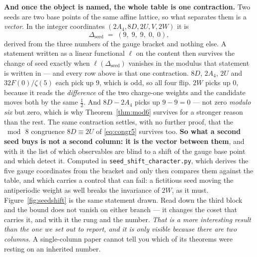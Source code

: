 \documentclass[11pt,a4paper]{article}
\begin{document}
\begin{itemize}
\noindent \textbf{And once the object is named, the whole table is one contraction.} Two seeds are
two base points of the same affine lattice, so what separates them is a \emph{vector}. In the
integer coordinates $(2A_4,8D,2U,V,2W)$ it is
\[
  \Delta_{\mathrm{seed}}\;=\;(9,\;9,\;9,\;0,\;0),
\]
derived from the three numbers of the gauge bracket and nothing else. A statement written as a
linear functional $\ell$ on the content then survives the change of seed exactly when
$\ell(\Delta_{\mathrm{seed}})$ vanishes in the modulus that statement is written in --- and every
row above is that one contraction. $8D$, $2A_4$, $2U$ and $32F(0)/\zeta(5)$ each pick up $9$, which
is odd, so all four flip. $2W$ picks up $0$, because it reads the \emph{difference} of the two
charge-one weights and the candidate moves both by the same $\tfrac12$. And $8D-2A_4$ picks up
$9-9=0$ --- not zero \emph{modulo six} but zero, which is why Theorem~\ref{thm:mod6} survives for a
stronger reason than the rest. The same contraction settles, with no further proof, that the
$\bmod\,8$ congruence $8D\equiv2U$ of \eqref{eq:congr5} survives too. \textbf{So what a second seed
buys is not a second column: it is the vector between them}, and with it the list of which
observables are blind to a shift of the gauge base point and which detect it. Computed in
\texttt{seed\_\allowbreak shift\_\allowbreak character.py}, which derives the five gauge
coordinates from the bracket and only then compares them against the table, and which carries a
control that can fail: a fictitious seed moving the antiperiodic weight as well breaks the
invariance of $2W$, as it must. Figure~\ref{fig:seedshift} is the same statement drawn. Read down the third block and the bound does
not vanish on either branch --- it changes the coset that carries it, and with it the rung and the
number. \emph{That is a more interesting result than the one we set out to report, and it is only
visible because there are two columns.} A single-column paper cannot tell you which of its theorems
were resting on an inherited number.


\end{itemize}
\end{document}
